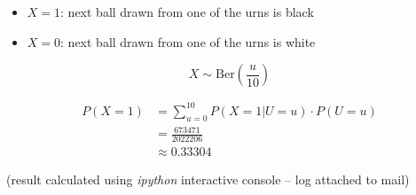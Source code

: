 \begin{itemize}
\item{$X=1$: next ball drawn from one of the urns is black}
\item{$X=0$: next ball drawn from one of the urns is white}
\end{itemize}

\[ X \sim \mathrm{Ber}\left( \frac{u}{10} \right) \]

\begin{align*}
P(X=1) &= \sum\limits_{u=0}^{10} P(X=1|U=u) \cdot P(U=u) \\
       &= \frac{673471}{2022206} \\
       &\approx 0.33304
\end{align*}

(result calculated using \emph{ipython} interactive console -- log attached to mail)

